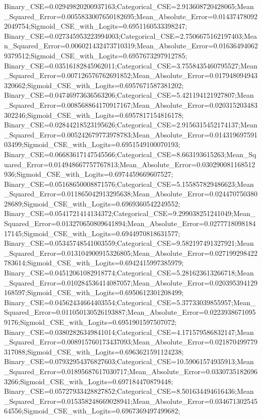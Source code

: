 Binary_CSE=0.02949820200937163;Categorical_CSE=2.913608720428065;Mean_Squared_Error=0.0055833007650182695;Mean_Absolute_Error=0.014374780922049754;Sigmoid_CSE_with_Logits=0.6951160533398247;
Binary_CSE=0.027345953223994003;Categorical_CSE=2.7506675162197403;Mean_Squared_Error=0.006021432473710319;Mean_Absolute_Error=0.016364940629379512;Sigmoid_CSE_with_Logits=0.6957673297912785;
Binary_CSE=0.03516182845962011;Categorical_CSE=3.7558435460795527;Mean_Squared_Error=0.007126576762691852;Mean_Absolute_Error=0.017948094943320662;Sigmoid_CSE_with_Logits=0.6957671587381202;
Binary_CSE=0.04746973636563206;Categorical_CSE=5.421194121927807;Mean_Squared_Error=0.008568864170917167;Mean_Absolute_Error=0.020315203483302246;Sigmoid_CSE_with_Logits=0.6957817154816178;
Binary_CSE=0.02844218523195626;Categorical_CSE=2.9156315452174137;Mean_Squared_Error=0.005242679773978783;Mean_Absolute_Error=0.01431969759103499;Sigmoid_CSE_with_Logits=0.6951549100070193;
Binary_CSE=0.06683617147545566;Categorical_CSE=8.663193615263;Mean_Squared_Error=0.014948667757767813;Mean_Absolute_Error=0.030290081168512936;Sigmoid_CSE_with_Logits=0.6974459669607527;
Binary_CSE=0.05168650008871576;Categorical_CSE=5.155857829486623;Mean_Squared_Error=0.011865042913295638;Mean_Absolute_Error=0.02447075038028689;Sigmoid_CSE_with_Logits=0.6969360542249552;
Binary_CSE=0.0541721414134372;Categorical_CSE=9.299038251241049;Mean_Squared_Error=0.013270650809641894;Mean_Absolute_Error=0.027771809818417145;Sigmoid_CSE_with_Logits=0.6944970818631577;
Binary_CSE=0.05345748541003559;Categorical_CSE=9.582197491327921;Mean_Squared_Error=0.013104900915326805;Mean_Absolute_Error=0.027199298422783614;Sigmoid_CSE_with_Logits=0.6942415997385979;
Binary_CSE=0.04512061082918774;Categorical_CSE=5.281623613266718;Mean_Squared_Error=0.010284536414087057;Mean_Absolute_Error=0.020395394129168597;Sigmoid_CSE_with_Logits=0.6950612301208499;
Binary_CSE=0.04562434664403554;Categorical_CSE=5.37733039855957;Mean_Squared_Error=0.011050130526193887;Mean_Absolute_Error=0.02239386710959176;Sigmoid_CSE_with_Logits=0.6951901597507072;
Binary_CSE=0.03802826349841014;Categorical_CSE=4.171579586832147;Mean_Squared_Error=0.008915760173437093;Mean_Absolute_Error=0.021870499779317088;Sigmoid_CSE_with_Logits=0.6963621591124238;
Binary_CSE=0.07932954376827603;Categorical_CSE=10.59061574935913;Mean_Squared_Error=0.01895687617030717;Mean_Absolute_Error=0.03307351826963266;Sigmoid_CSE_with_Logits=0.697184470879448;
Binary_CSE=0.05727933428827852;Categorical_CSE=8.501634494616436;Mean_Squared_Error=0.015358248669028941;Mean_Absolute_Error=0.03467130254564556;Sigmoid_CSE_with_Logits=0.6967369497499682;
